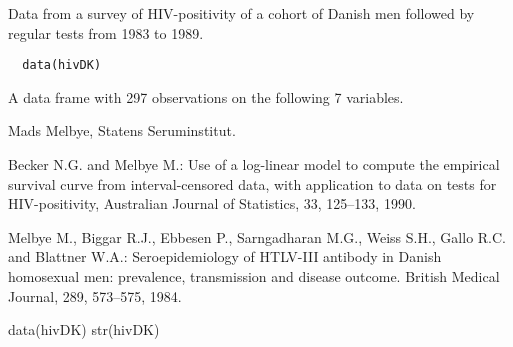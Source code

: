 \begin{Description}\relax
Data from a survey of HIV-positivity of a cohort of Danish
men followed by regular tests from 1983 to 1989.
\end{Description}
\begin{Usage}
\begin{verbatim}
  data(hivDK)
  \end{verbatim}
\end{Usage}
\begin{Format}\relax
A data frame with 297 observations on the following 7 variables.
\end{Format}
\begin{Source}\relax
Mads Melbye, Statens Seruminstitut.
\end{Source}
\begin{References}\relax
Becker N.G. and Melbye M.: Use of a log-linear model to
compute the empirical survival curve from interval-censored data,
with application to data on tests for HIV-positivity, Australian
Journal of Statistics, 33, 125--133, 1990.

Melbye M., Biggar R.J., Ebbesen P., Sarngadharan M.G., Weiss
S.H., Gallo R.C. and Blattner W.A.: Seroepidemiology of HTLV-III
antibody in Danish homosexual men: prevalence, transmission and
disease outcome. British Medical Journal, 289, 573--575, 1984.
\end{References}
\begin{Examples}
\begin{ExampleCode}
  data(hivDK)
  str(hivDK) 
  \end{ExampleCode}
\end{Examples}

